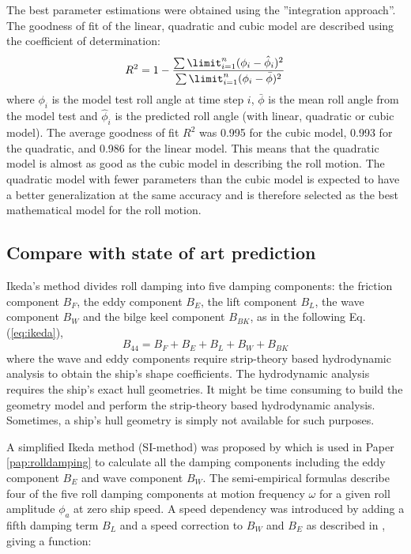 \noindent The best parameter estimations were obtained using the ''integration approach''.
The goodness of fit of the linear, quadratic and cubic model are described using the coefficient of determination:
\begin{equation} \label{eq:R2}
R^2=1-\frac{\sum\limit_{i=1}^{n}(\phi_{i}-\hat{\phi}_i)^2}{\sum\limit_{i=1}^{n}(\phi_i-\bar \phi)^2}
\end{equation}
where $\phi_i$ is the model test roll angle at time step $i$, $\bar \phi$ is the mean roll angle from the model test and $\hat{\phi}_i$ is the predicted roll angle (with linear, quadratic or cubic model). The average goodness of fit $R^2$ was 0.995 for the cubic model, 0.993 for the quadratic, and 0.986 for the linear model. This means that the quadratic model is almost as good as the cubic model in describing the roll motion. The quadratic model with fewer parameters than the cubic model is expected to have a better generalization at the same accuracy and is therefore selected as the best mathematical model for the roll motion. 

\subsection{Compare with state of art prediction}
Ikeda's method divides roll damping into five damping components: the friction component $B_F$, the eddy component $B_E$, the lift component $B_L$, the wave component $B_W$ and the bilge keel component $B_{BK}$, as in the following Eq.(\ref{eq:ikeda}), 
\begin{equation} \label{eq:ikeda}
B_{44} = B_F + B_E + B_L + B_W + B_{BK}
\end{equation}
where the wave and eddy components require strip-theory based hydrodynamic analysis to obtain the ship's shape coefficients. The hydrodynamic analysis requires the ship's exact hull geometries. It might be time consuming to build the geometry model and perform the strip-theory based hydrodynamic analysis. Sometimes, a ship's hull geometry is simply not available for such purposes. 

A simplified Ikeda method (SI-method) was proposed by \parencite{kawahara_simple_2011} which is used in Paper \ref{pap:rolldamping} to calculate all the damping components including the eddy component $B_E$ and wave component $B_W$. The semi-empirical formulas describe four of the five roll damping components at motion frequency $\omega$ for a given roll amplitude $\phi_a$ at zero ship speed. A speed dependency was introduced by adding a fifth damping term $B_L$ and a speed correction to $B_W$ and $B_E$ as described in \parencite{ikeda_velocity_1979}, giving a function: 


